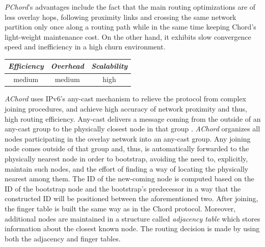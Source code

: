 \emph{PChord}’s advantages include the fact that the main routing optimizations are of
less overlay hops, following proximity links and crossing the same network
partition only once along a routing path while in the same time keeping Chord's
light-weight maintenance cost. On the other hand, it exhibits slow convergence
speed and inefficiency in a high churn environment\cite{DK2006}.

\begin{center}
\begin{tabular}{ccc}
\emph{Efficiency} & \emph{Overhead} & \emph{Scalability} \\
\hline
medium &
medium &
high
\end{tabular}
\end{center}

\emph{AChord} \cite{DK2006} uses IPv6's any-cast mechanism to
relieve the protocol from complex joining procedures, and achieve high accuracy
of network proximity and thus, high routing efficiency. Any-cast delivers a message
coming from the outside of an any-cast group to the physically closest node in
that group \cite{M2002}. \emph{AChord} organizes all nodes participating in the
overlay network into an any-cast group. Any joining node comes outside of that group
and, thus, is
automatically forwarded to the physically nearest node in order to bootstrap,
avoiding the need to, explicitly, maintain such nodes, and the effort of finding
a way of locating the physically nearest among them. The ID of the new-coming
node is computed based on the ID of the bootstrap node and the bootstrap's
predecessor in a way that the constructed ID will be positioned between the
aforementioned two. After joining, the finger table is built the same way as in
the Chord protocol. Moreover, additional nodes are maintained in a structure
called \emph{adjacency table} which stores information about the closest known
node. The routing decision is made by using both the adjacency and finger
tables.

